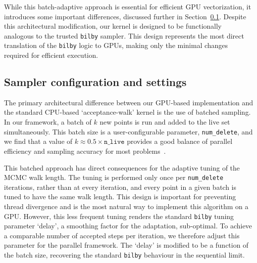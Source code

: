 \documentclass[fleqn,usenatbib]{mnras}
\begin{document}
While this batch-adaptive approach is essential for efficient GPU
vectorization, it introduces some important differences, discussed further in Section~\ref{sec:sampler_config}.
Despite this architectural modification, our kernel is designed to be functionally
analogous to the trusted \texttt{bilby} sampler. This design
represents the most direct translation of the \texttt{bilby} logic
to GPUs, making only the minimal changes required for efficient execution. 

\subsection{Sampler configuration and settings}
\label{sec:sampler_config}

The primary architectural difference between our GPU-based implementation
and the standard CPU-based `acceptance-walk' kernel is the use of
batched sampling. In our framework, a batch of $k$ new points is
run and added to the live set simultaneously. This batch size is
a user-configurable parameter, \texttt{num\_delete}, and we find that a
value of \mbox{$k \approx 0.5 \times \texttt{n\_live}$} provides a good balance
of parallel efficiency and sampling accuracy for most problems~\citep{yallup2025nested}.

This batched approach has direct consequences for the adaptive tuning of
the MCMC walk length. The tuning is performed only once per \texttt{num\_delete} iterations, 
rather than at every iteration, and every point in a given batch is tuned to have the same walk length.
This design is important for preventing thread divergence and is the 
most natural way to implement this algorithm on a GPU.
However, this less frequent tuning renders the standard \texttt{bilby}
tuning parameter `delay', a smoothing factor for
the adaptation, sub-optimal. 
To achieve a comparable number of accepted steps per
iteration, we therefore adjust this parameter for the parallel
framework. The `delay' is modified to be a function of the batch size,
recovering the standard \texttt{bilby} behaviour in the sequential
limit.

\end{document}
